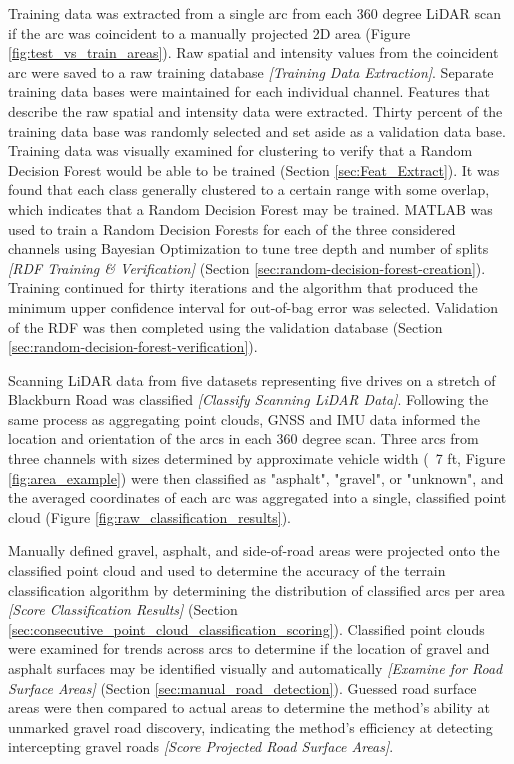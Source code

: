 \documentclass[numbered,pdftex]{ohio-etd}
\begin{document}
{		{Training data was extracted from a single arc from each 360 degree LiDAR scan if the arc was coincident to a manually projected 2D area (Figure \ref{fig:test_vs_train_areas}). Raw spatial and intensity values from the coincident arc were saved to a raw training database \textit{[Training Data Extraction]}. Separate training data bases were maintained for each individual channel. Features that describe the raw spatial and intensity data were extracted. Thirty percent of the training data base was randomly selected and set aside as a validation data base. Training data was visually examined for clustering to verify that a Random Decision Forest would be able to be trained (Section \ref{sec:Feat_Extract}). It was found that each class generally clustered to a certain range with some overlap, which indicates that a Random Decision Forest may be trained. MATLAB was used to train a Random Decision Forests for each of the three considered channels using Bayesian Optimization to tune tree depth and number of splits \textit{[RDF Training \& Verification]} (Section \ref{sec:random-decision-forest-creation}). Training continued for thirty iterations and the algorithm that produced the minimum upper confidence interval for out-of-bag error was selected. Validation of the RDF was then completed using the validation database (Section \ref{sec:random-decision-forest-verification}).}
		
		{Scanning LiDAR data from five datasets representing five drives on a stretch of Blackburn Road was classified \textit{[Classify Scanning LiDAR Data]}. Following the same process as aggregating point clouds, GNSS and IMU data informed the location and orientation of the arcs in each 360 degree scan. Three arcs from three channels with sizes determined by approximate vehicle width (~7 ft, Figure \ref{fig:area_example}) were then classified as "asphalt", "gravel", or "unknown", and the averaged coordinates of each arc was aggregated into a single, classified point cloud (Figure \ref{fig:raw_classification_results}).}
		
		
		{Manually defined gravel, asphalt, and side-of-road areas were projected onto the classified point cloud and used to determine the accuracy of the terrain classification algorithm by determining the distribution of classified arcs per area \textit{[Score Classification Results]} (Section \ref{sec:consecutive_point_cloud_classification_scoring}). Classified point clouds were examined for trends across arcs to determine if the location of gravel and asphalt surfaces may be identified visually and automatically \textit{[Examine for Road Surface Areas]} (Section \ref{sec:manual_road_detection}). Guessed road surface areas were then compared to actual areas to determine the method's ability at unmarked gravel road discovery, indicating the method's efficiency at detecting intercepting gravel roads \textit{[Score Projected Road Surface Areas]}.}

}
\end{document}
